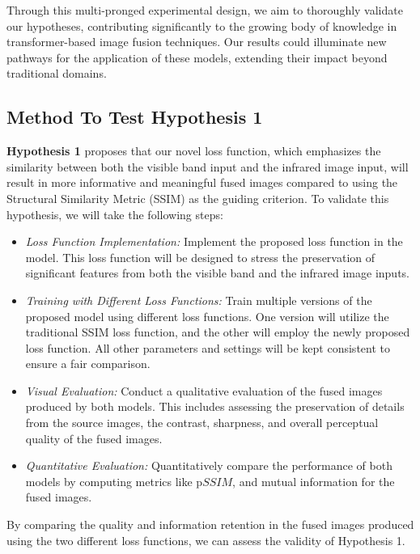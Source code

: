 Through this multi-pronged experimental design, we aim to thoroughly validate our hypotheses, contributing significantly to the growing body of knowledge in transformer-based image fusion techniques. Our results could illuminate new pathways for the application of these models, extending their impact beyond traditional domains.

\subsection{Method To Test Hypothesis 1} \label{subsec:met2}


\textbf{Hypothesis 1} proposes that our novel loss function, which emphasizes the similarity between both the visible band input and the infrared image input, will result in more informative and meaningful fused images compared to using the Structural Similarity Metric (SSIM) as the guiding criterion. To validate this hypothesis, we will take the following steps:

\begin{itemize}

    \item \textit{Loss Function Implementation:} Implement the proposed loss function in the model. This loss function will be designed to stress the preservation of significant features from both the visible band and the infrared image inputs.

    \item \textit{Training with Different Loss Functions:} Train multiple versions of the proposed model using different loss functions. One version will utilize the traditional SSIM loss function, and the other will employ the newly proposed loss function. All other parameters and settings will be kept consistent to ensure a fair comparison.

    \item \textit{Visual Evaluation:} Conduct a qualitative evaluation of the fused images produced by both models. This includes assessing the preservation of details from the source images, the contrast, sharpness, and overall perceptual quality of the fused images.

    \item \textit{Quantitative Evaluation:} Quantitatively compare the performance of both models by computing metrics like p$SSIM$, and mutual information for the fused images.

\end{itemize}

By comparing the quality and information retention in the fused images produced using the two different loss functions, we can assess the validity of Hypothesis 1.

